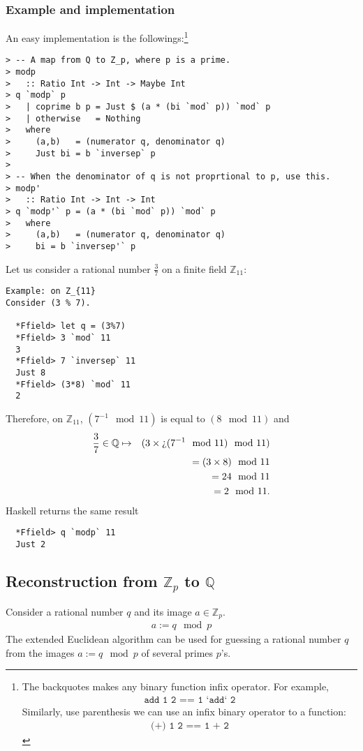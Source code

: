 \documentclass[11pt]{book}
\begin{document}
\subsubsection{Example and implementation}
An easy implementation is the followings:\footnote{
The backquotes makes any binary function infix operator.
For example,
\begin{eqnarray}
\texttt{add 1 2 == 1 `add` 2}
\end{eqnarray}
Similarly, use parenthesis we can use an infix binary operator to a function:
\begin{eqnarray}
\texttt{(+) 1 2 == 1 + 2}
\end{eqnarray}
}
\begin{verbatim}
> -- A map from Q to Z_p, where p is a prime.
> modp 
>   :: Ratio Int -> Int -> Maybe Int
> q `modp` p 
>   | coprime b p = Just $ (a * (bi `mod` p)) `mod` p
>   | otherwise   = Nothing
>   where
>     (a,b)   = (numerator q, denominator q)
>     Just bi = b `inversep` p
>
> -- When the denominator of q is not proprtional to p, use this.
> modp' 
>   :: Ratio Int -> Int -> Int
> q `modp'` p = (a * (bi `mod` p)) `mod` p
>   where
>     (a,b)   = (numerator q, denominator q)
>     bi = b `inversep'` p
\end{verbatim}
Let us consider a rational number $\frac{3}{7}$ on a finite field $\mathbb{Z}_{11}$:
\begin{verbatim}
Example: on Z_{11}
Consider (3 % 7).

  *Ffield> let q = (3%7)
  *Ffield> 3 `mod` 11
  3
  *Ffield> 7 `inversep` 11
  Just 8
  *Ffield> (3*8) `mod` 11
  2
\end{verbatim}
Therefore, on $\mathbb{Z}_{11}$, $(7^{-1} \mod 11)$ is equal to $(8 \mod 11)$ and
\begin{eqnarray}
\frac{3}{7} \in \mathbb{Q} &\mapsto& (3 \times \text{\textquestiondown}(7^{-1} \mod 11) \mod 11) \\
&&= (3 \times 8) \mod 11 \\
&&= 24 \mod 11 \\
&&= 2 \mod 11.
\end{eqnarray}
Haskell returns the same result
\begin{verbatim}  
  *Ffield> q `modp` 11
  Just 2
\end{verbatim}

\subsection{Reconstruction from $\mathbb{Z}_p$ to $\mathbb{Q}$}
Consider a rational number $q$ and its image $a \in \mathbb{Z}_p$.
\begin{eqnarray}
a := q \mod p
\end{eqnarray}
The extended Euclidean algorithm can be used for guessing a rational number $q$ from the images $a := q \mod p$ of several primes $p$'s.
\end{document}
